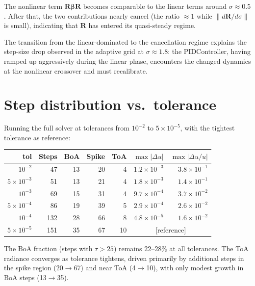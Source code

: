 \documentclass[11pt]{article}
\newcommand{\bR}{\mathbf{R}}
\newcommand{\bbeta}{\boldsymbol{\beta}}
\newcommand{\norm}[1]{\lVert #1 \rVert}
\begin{document}
The nonlinear term $\bR\bbeta\bR$ becomes comparable to the
linear terms around $\sigma\approx0.5$.  After that, the two
contributions nearly cancel (the ratio $\approx 1$ while $\norm{d\bR/d\sigma}$
is small), indicating that $\bR$ has entered its quasi-steady
regime.

The transition from the linear-dominated to the cancellation regime
explains the step-size drop observed in the adaptive grid at
$\sigma\approx1.8$: the PIDController, having ramped up aggressively
during the linear phase, encounters the changed dynamics at the
nonlinear crossover and must recalibrate.


\section{Step distribution vs.\ tolerance}

Running the full solver at tolerances from $10^{-2}$ to $5\times10^{-5}$,
with the tightest tolerance as reference:

\begin{center}
\begin{tabular}{r r r r r r r}
\toprule
tol & Steps & BoA & Spike & ToA & $\max|\Delta u|$ & $\max|\Delta u/u|$\\
\midrule
$10^{-2}$          &  47 & 13 & 20 &  4 & $1.2\times10^{-3}$ & $3.8\times10^{-1}$\\
$5\times10^{-3}$   &  51 & 13 & 21 &  4 & $1.8\times10^{-3}$ & $1.4\times10^{-1}$\\
$10^{-3}$          &  69 & 15 & 31 &  4 & $9.7\times10^{-4}$ & $3.7\times10^{-2}$\\
$5\times10^{-4}$   &  86 & 19 & 39 &  5 & $2.9\times10^{-4}$ & $2.6\times10^{-2}$\\
$10^{-4}$          & 132 & 28 & 66 &  8 & $4.8\times10^{-5}$ & $1.6\times10^{-2}$\\
$5\times10^{-5}$   & 151 & 35 & 67 & 10 & \multicolumn{2}{c}{[reference]}\\
\bottomrule
\end{tabular}
\end{center}

The BoA fraction (steps with $\tau>25$) remains
$22\text{--}28\%$ at all tolerances.  The ToA radiance converges
as tolerance tightens, driven primarily by additional steps in the
spike region (20$\to$67) and near ToA (4$\to$10), with only
modest growth in BoA steps (13$\to$35).
\end{document}
